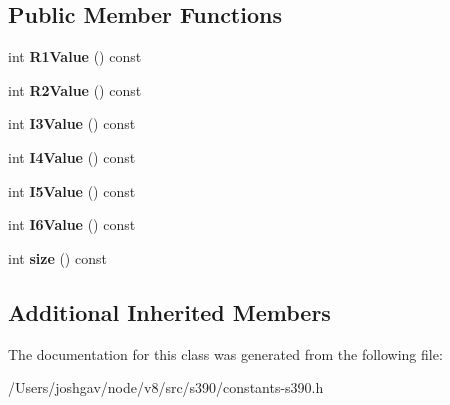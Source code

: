 \subsection*{Public Member Functions}
\begin{DoxyCompactItemize}
\item 
int {\bfseries R1\+Value} () const \hypertarget{classv8_1_1internal_1_1_r_i_e_instruction_ab40eeda761c8115d0372c8f4462957f8}{}\label{classv8_1_1internal_1_1_r_i_e_instruction_ab40eeda761c8115d0372c8f4462957f8}

\item 
int {\bfseries R2\+Value} () const \hypertarget{classv8_1_1internal_1_1_r_i_e_instruction_a6f4ff3477c73f9b5de7d422200815532}{}\label{classv8_1_1internal_1_1_r_i_e_instruction_a6f4ff3477c73f9b5de7d422200815532}

\item 
int {\bfseries I3\+Value} () const \hypertarget{classv8_1_1internal_1_1_r_i_e_instruction_a883dd48bfc65dbe4c504c654e26f9395}{}\label{classv8_1_1internal_1_1_r_i_e_instruction_a883dd48bfc65dbe4c504c654e26f9395}

\item 
int {\bfseries I4\+Value} () const \hypertarget{classv8_1_1internal_1_1_r_i_e_instruction_ace9b15398f271673769801b868c33dc0}{}\label{classv8_1_1internal_1_1_r_i_e_instruction_ace9b15398f271673769801b868c33dc0}

\item 
int {\bfseries I5\+Value} () const \hypertarget{classv8_1_1internal_1_1_r_i_e_instruction_a5997fd7b05e0f67958a69bf6db6b8579}{}\label{classv8_1_1internal_1_1_r_i_e_instruction_a5997fd7b05e0f67958a69bf6db6b8579}

\item 
int {\bfseries I6\+Value} () const \hypertarget{classv8_1_1internal_1_1_r_i_e_instruction_a21420628fb3ba612e634b3799b1fbb95}{}\label{classv8_1_1internal_1_1_r_i_e_instruction_a21420628fb3ba612e634b3799b1fbb95}

\item 
int {\bfseries size} () const \hypertarget{classv8_1_1internal_1_1_r_i_e_instruction_ac8ed0caaecd844ffb3c38d708076dc99}{}\label{classv8_1_1internal_1_1_r_i_e_instruction_ac8ed0caaecd844ffb3c38d708076dc99}

\end{DoxyCompactItemize}
\subsection*{Additional Inherited Members}


The documentation for this class was generated from the following file\+:\begin{DoxyCompactItemize}
\item 
/\+Users/joshgav/node/v8/src/s390/constants-\/s390.\+h\end{DoxyCompactItemize}
